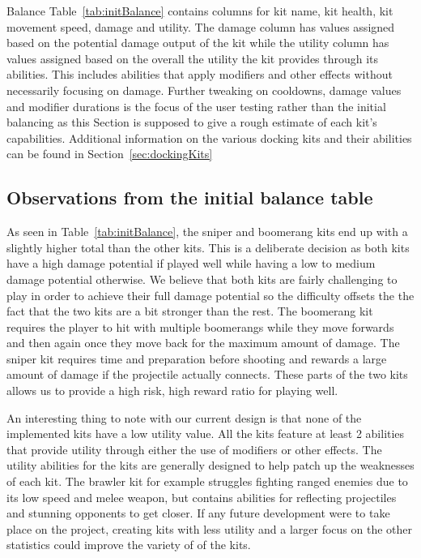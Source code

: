 Balance Table~\ref{tab:initBalance} contains columns for kit name, kit health, kit movement speed, damage and utility. The damage column has values assigned based on the potential damage output of the kit while the utility column has values assigned based on the overall the utility the kit provides through its abilities. This includes abilities that apply modifiers and other effects without necessarily focusing on damage. Further tweaking on cooldowns, damage values and modifier durations is the focus of the user testing rather than the initial balancing as this Section is supposed to give a rough estimate of each kit's capabilities. 
Additional information on the various docking kits and their abilities can be found in Section~\ref{sec:dockingKits}

\subsection{Observations from the initial balance table}     
As seen in Table~\ref{tab:initBalance}, the sniper and boomerang kits end up with a slightly higher total than the other kits. This is a deliberate decision as both kits have a high damage potential if played well while having a low to medium damage potential otherwise. We believe that both kits are fairly challenging to play in order to achieve their full damage potential so the difficulty offsets the the fact that the two kits are a bit stronger than the rest. 
The boomerang kit requires the player to hit with multiple boomerangs while they move forwards and then again once they move back for the maximum amount of damage. The sniper kit requires time and preparation before shooting and rewards a large amount of damage if the projectile actually connects.  
These parts of the two kits allows us to provide a high risk, high reward ratio for playing well.

An interesting thing to note with our current design is that none of the implemented kits have a low utility value. All the kits feature at least 2 abilities that provide utility through either the use of modifiers or other effects. The utility abilities for the kits are generally designed to help patch up the weaknesses of each kit. The brawler kit for example struggles fighting ranged enemies due to its low speed and melee weapon, but contains abilities for reflecting projectiles and stunning opponents to get closer. If any future development were to take place on the project, creating kits with less utility and a larger focus on the other statistics could improve the variety of of the kits.

